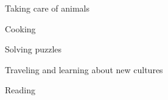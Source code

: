 



\cventry
{} %
{} %
{} %
{} %
{ %
\begin{cvitems}
  \item {Taking care of animals}
  \item {Cooking}
  \item {Solving puzzles}
  \item {Traveling and learning about new cultures}
  \item {Reading}
\end{cvitems}
}
